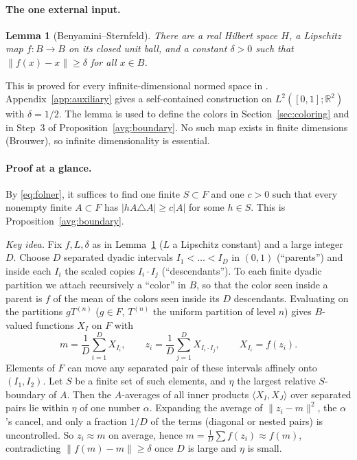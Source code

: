 \documentclass[11pt]{article}
\newcommand{\R}{\mathbb R}
\newcommand{\norm}[1]{\lVert #1\rVert}
\newcommand{\ip}[2]{\langle #1,#2\rangle}
\newtheorem{lemma}[theorem]{Lemma}
\theoremstyle{definition}
\numberwithin{equation}{section}
\begin{document}
\paragraph{The one external input.}
\begin{lemma}[Benyamini--Sternfeld]\label{lem:displacement}
There are a real Hilbert space \(H\), a Lipschitz map \(f:B\to B\) on its
closed unit ball, and a constant \(\delta>0\) such that
\(\norm{f(x)-x}\ge\delta\) for all \(x\in B\).
\end{lemma}
This is proved for every infinite-dimensional normed space in
\cite[Theorem, part~(3), p.~439]{BenyaminiSternfeld1983}.
Appendix~\ref{app:auxiliary} gives a self-contained construction on
$L^2([0,1];\R^2)$ with $\delta=1/2$. The lemma is used to define the
colors in Section~\ref{sec:coloring} and in Step~3 of
Proposition~\ref{avg:boundary}. No such map exists in finite dimensions
(Brouwer), so infinite dimensionality is essential.

\paragraph{Proof at a glance.}
By \eqref{eq:folner}, it suffices to find one finite $S\subset F$ and one
$c>0$ such that every nonempty finite $A\subset F$ has
$|hA\triangle A|\ge c|A|$ for some $h\in S$. This is
Proposition~\ref{avg:boundary}.

\emph{Key idea.} Fix $f,L,\delta$ as in Lemma~\ref{lem:displacement}
($L$ a Lipschitz constant) and a large integer $D$. Choose $D$ separated
dyadic intervals $I_1<\dots<I_D$ in $(0,1)$ (``parents'') and inside each
$I_i$ the scaled copies $I_i\cdot I_j$ (``descendants''). To each finite
dyadic partition we attach recursively a ``color'' in $B$, so that the color
seen inside a parent is $f$ of the mean of the colors seen inside its $D$
descendants. Evaluating on the partitions $gT^{(n)}$ ($g\in F$, $T^{(n)}$
the uniform partition of level $n$) gives $B$-valued functions $X_I$ on $F$
with
\[
 m=\frac1D\sum_{i=1}^D X_{I_i},\qquad
 z_i=\frac1D\sum_{j=1}^D X_{I_i\cdot I_j},\qquad
 X_{I_i}=f(z_i).
\]
Elements of $F$ can move any separated pair of these intervals affinely onto
$(I_1,I_2)$. Let $S$ be a finite set of such elements, and $\eta$ the largest
relative $S$-boundary of $A$. Then the $A$-averages of all inner products
$\ip{X_I}{X_J}$ over separated pairs lie within $\eta$ of one number
$\alpha$. Expanding the average of $\norm{z_i-m}^2$, the $\alpha$'s cancel,
and only a fraction $1/D$ of the terms (diagonal or nested pairs) is
uncontrolled. So $z_i\approx m$ on average, hence
$m=\frac1D\sum f(z_i)\approx f(m)$, contradicting $\norm{f(m)-m}\ge\delta$
once $D$ is large and $\eta$ is small.
\end{document}
